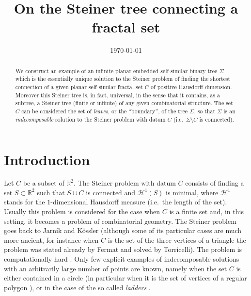 \documentclass{amsart}
\date{\today}
\title{On the Steiner tree connecting a fractal set}
\newcommand{\RR}{\mathbb R}
\renewcommand{\H}{\mathcal H}
\renewcommand{\H}{\mathcal{H}}
\theoremstyle{definition}
\theoremstyle{remark}
\begin{document}
\begin{abstract}
We construct an example of an infinite planar embedded self-similar binary tree  
$\Sigma$ which is the essentially unique solution to the Steiner problem of finding 
the shortest connection of a given planar self-similar fractal set $C$
of positive Hausdorff dimension.
Moreover this Steiner tree is, in fact, universal, in the sense that 
it contains, as a subtree, a Steiner tree (finite or infinite) of any given combinatorial structure.
The set $C$ can be considered the set of \emph{leaves}, or the ``boundary'',
of the tree $\Sigma$,
so that $\Sigma$ is an \emph{indecomposable} solution to the Steiner problem
with datum $C$ (i.e.\ $\Sigma\setminus C$ is connected).
\end{abstract}

\maketitle

\section{Introduction}

Let $C$ be a subset of $\RR^2$.
The Steiner problem with datum $C$ consists of finding a set $S\subset \RR^2$ 
such that $S\cup C$ is connected and $\H^1(S)$ is minimal, where $\H^1$ stands 
for the $1$-dimensional Hausdorff measure (i.e.\ the length of the set).
Usually this problem is considered for the case when $C$ is a finite 
set and, in this setting, it becomes a problem of combinatorial geometry. 
The Steiner problem goes back to Jarník and Kössler \cite{JarKos34} 
(although some of its particular cases are much more ancient, for instance 
when $C$ is the set of the three vertices of a triangle the problem was 
stated already by Fermat and solved by Torricelli).
The problem is computationally hard \cite{GarGraJoh77}.
Only few explicit examples of indecomposable solutions with an arbitrarily large number of points 
are known, namely when the set $C$ is either contained in a circle 
\cite{Rub97}
(in particular when it is the set of vertices of a regular polygon
\cite{DuHwaWen87}),
or in the case of the so called \emph{ladders} 
\cite{BurDudMai96,BurDud96,ChuGra78}.
\end{document}
